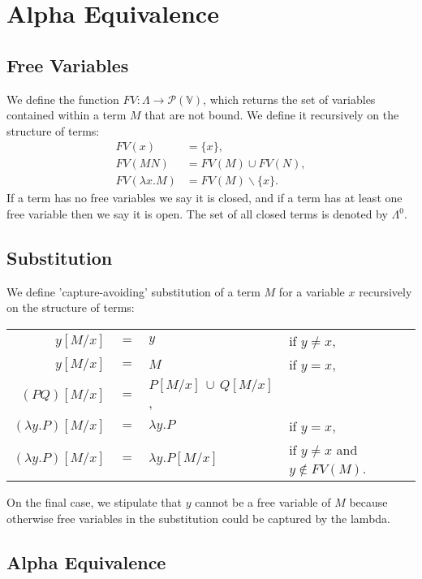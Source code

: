 \section{Alpha Equivalence}

\subsection{Free Variables}

We define the function $FV : \Lambda \to \mathcal{P}(\mathbb{V})$,
which returns the set of variables contained within a term $M$ that
are not bound. We define it recursively on the structure of terms: 
\begin{align*}
    FV(x) &= \{x\}, \\
    FV(MN) &= FV(M) \cup FV(N), \\
    FV(\lambda x.M) &= FV(M) \backslash \{x\}.
\end{align*} If a term has no free variables we say it is closed,
and if a term has at least one free variable then we say it is open.
The set of all closed terms is denoted by $\Lambda^0$.

\subsection{Substitution}

We define 'capture-avoiding' substitution of a term $M$ for a variable $x$
recursively on the structure of terms: \begin{center}
    \begin{tabular}{ r c l l }
        $y[M/x]$             & $=$ & $y$                        & if $y \neq x$, \\
        $y[M/x]$             & $=$ & $M$                        & if $y = x$, \\
        $(PQ)[M/x]$          & $=$ & $P[M/x] \, \cup \, Q[M/x]$, & \\
        $(\lambda y.P)[M/x]$ & $=$ & $\lambda y.P$              & if $y = x$, \\
        $(\lambda y.P)[M/x]$ & $=$ & $\lambda y.P[M/x]$         & if $y \neq x$ and $y \notin FV(M)$.
    \end{tabular} 
\end{center} On the final case, we stipulate that $y$ cannot be a free variable of
$M$ because otherwise free variables in the substitution could be captured by
the lambda.

\subsection{Alpha Equivalence}

